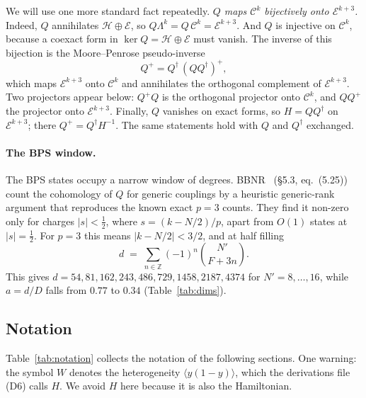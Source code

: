\documentclass[11pt]{article}
\newcommand{\Np}{N'}
\newcommand{\Hc}{\mathcal H}
\newcommand{\Ec}{\mathcal E}
\newcommand{\Cc}{\mathcal C}
\theoremstyle{plain}
\theoremstyle{remark}
\numberwithin{equation}{section}
\begin{document}
We will use one more standard fact repeatedly. \emph{$Q$ maps $\Cc^k$ bijectively onto $\Ec^{k+3}$.} Indeed, $Q$
annihilates $\Hc\oplus\Ec$, so $Q\Lambda^k=Q\,\Cc^k=\Ec^{k+3}$. And $Q$ is injective on $\Cc^k$, because a coexact form
in $\ker Q=\Hc\oplus\Ec$ must vanish. The inverse of this bijection is the Moore--Penrose pseudo-inverse
\begin{equation}\label{eq:pinv}
Q^+ = Q^\dagger\,(QQ^\dagger)^+ ,
\end{equation}
which maps $\Ec^{k+3}$ onto $\Cc^k$ and annihilates the orthogonal complement of $\Ec^{k+3}$. Two projectors appear
below: $Q^+Q$ is the orthogonal projector onto $\Cc^k$, and $QQ^+$ the projector onto $\Ec^{k+3}$. Finally, $Q$ vanishes
on exact forms, so $H=QQ^\dagger$ on $\Ec^{k+3}$; there $Q^+=Q^\dagger H^{-1}$. The same statements hold with $Q$ and
$Q^\dagger$ exchanged.

\paragraph{The BPS window.} The BPS states occupy a narrow window of degrees. BBNR~\cite{BBNR} (\S5.3, eq.~(5.25)) count
the cohomology of $Q$ for generic couplings by a heuristic generic-rank argument that reproduces the known exact $p=3$
counts. They find it non-zero only for charges $|s|<\tfrac12$, where $s=(k-N/2)/p$, apart from $O(1)$ states at $|s|=\tfrac12$. For $p=3$
this means $|k-N/2|<3/2$, and at half filling
\begin{equation}\label{eq:d}
d \;=\; \sum_{n\in\mathbb Z}(-1)^n\binom{\Np}{F+3n}.
\end{equation}
This gives $d=54,81,162,243,486,729,1458,2187,4374$ for $\Np=8,\dots,16$, while $a=d/D$ falls from $0.77$ to $0.34$
(Table~\ref{tab:dims}).

\subsection{Notation}

Table~\ref{tab:notation} collects the notation of the following sections. One warning: the symbol $W$ denotes the
heterogeneity $\langle y(1-y)\rangle$, which the derivations file  (D6) calls $H$. We avoid $H$
here because it is also the Hamiltonian.
\end{document}
